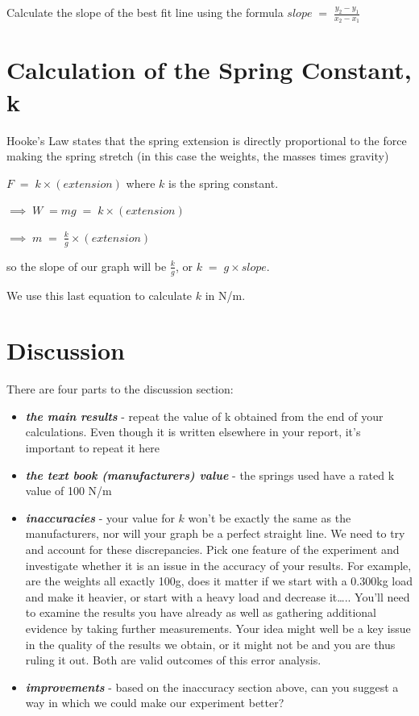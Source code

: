 \documentclass[
  letterpaper,
  DIV=11,
  numbers=noendperiod]{scrreprt}
\begin{document}
Calculate the slope of the best fit line using the formula
\(slope \; = \; \frac{y_2-y_1}{x_2-x_1}\)

\section{Calculation of the Spring Constant,
k}\label{calculation-of-the-spring-constant-k}

Hooke's Law states that the spring extension is directly proportional to
the force making the spring stretch (in this case the weights, the
masses times gravity)

\(F \; = \; k \times (extension)\) where \(k\) is the spring constant.

\(\implies \; W \; = mg \; = \; k \times (extension)\)

\(\implies \; m \; = \; \frac{k}{g} \times (extension)\)

so the slope of our graph will be \(\frac{k}{g}\), or
\(k \; = \; g \times slope\).

We use this last equation to calculate \(k\) in N/m.

\section{Discussion}\label{discussion-2}

There are four parts to the discussion section:

\begin{itemize}
\item
  \textbf{\emph{the main results}} - repeat the value of k obtained from
  the end of your calculations. Even though it is written elsewhere in
  your report, it's important to repeat it here
\item
  \textbf{\emph{the text book (manufacturers) value}} - the springs used
  have a rated k value of 100 N/m
\item
  \textbf{\emph{inaccuracies}} - your value for \(k\) won't be exactly
  the same as the manufacturers, nor will your graph be a perfect
  straight line. We need to try and account for these discrepancies.
  Pick one feature of the experiment and investigate whether it is an
  issue in the accuracy of your results. For example, are the weights
  all exactly 100g, does it matter if we start with a 0.300kg load and
  make it heavier, or start with a heavy load and decrease it\ldots..
  You'll need to examine the results you have already as well as
  gathering additional evidence by taking further measurements. Your
  idea might well be a key issue in the quality of the results we
  obtain, or it might not be and you are thus ruling it out. Both are
  valid outcomes of this error analysis.
\item
  \textbf{\emph{improvements}} - based on the inaccuracy section above,
  can you suggest a way in which we could make our experiment better?
\end{itemize}
\end{document}
